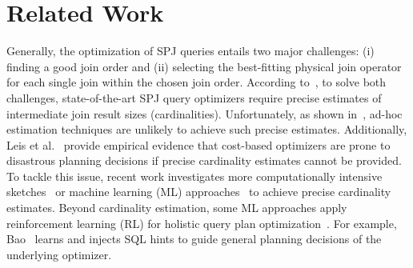 \section{Related Work}
\label{sec:RealtedWork}

Generally, the optimization of SPJ queries entails two major challenges: (i) finding a good join order and (ii) selecting the best-fitting physical join operator for each single join within the chosen join order. 
According to~\cite{DBLP:conf/pods/Chaudhuri98}, to solve both challenges, state-of-the-art SPJ query optimizers require precise estimates of intermediate join result sizes (cardinalities). 
Unfortunately, as shown in~\cite{DBLP:conf/icde/PerronSKS19}, ad-hoc estimation techniques are unlikely to achieve such precise estimates. 
Additionally, Leis et al.~\cite{DBLP:journals/pvldb/LeisGMBK015} provide empirical evidence that cost-based optimizers are prone to disastrous planning decisions if precise cardinality estimates cannot be provided. 
To tackle this issue, recent work investigates more computationally intensive sketches~\cite{DBLP:conf/sigmod/CaiBS19,DBLP:conf/sigmod/IzenovDRS21,DBLP:conf/sigmod/KipfVMKRLB0K19} or machine learning (ML) approaches~\cite{DBLP:journals/pvldb/HilprechtSKMKB20,DBLP:conf/cidr/KipfKRLBK19,DBLP:journals/pvldb/NegiMKMTKA21,DBLP:conf/sigmod/WoltmannHTHL19,DBLP:journals/pvldb/YangKLLDCS20} to achieve precise cardinality estimates. 
Beyond cardinality estimation, some ML approaches apply reinforcement learning (RL) for holistic query plan optimization~\cite{DBLP:journals/corr/abs-1808-03196,DBLP:conf/sigmod/MarcusNMTAK21,DBLP:journals/pvldb/MarcusNMZAKPT19}. 
For example, Bao~\cite{DBLP:conf/sigmod/MarcusNMTAK21} learns and injects SQL hints to guide general planning decisions of the underlying optimizer. 

